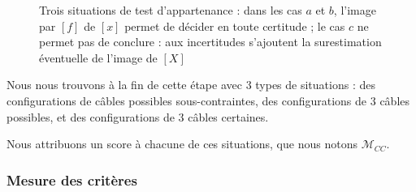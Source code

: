 \begin{figure}[!htp]
  \centering
\hfill
\hfill
    \caption{\footnotesize{Trois situations de test d'appartenance : dans les 
cas $a$ et $b$, l'image par $[f]$ de $[x]$ permet de d\'ecider en toute 
certitude ; le cas $c$ ne permet pas de conclure : aux incertitudes s'ajoutent 
la surestimation \'eventuelle de l'image de $[X]$}}
\label{chap03:fig06}
\end{figure}

Nous nous trouvons \`a la fin de cette \'etape avec $3$ types de situations : 
des configurations de c\^ables possibles sous-contraintes, des configurations 
de $3$ c\^ables possibles, et des configurations de $3$ c\^ables certaines.

Nous attribuons un score \`a chacune de ces situations, que nous notons 
$\mathcal M_{CC}$.

\subsubsection{Mesure des crit\`eres}


